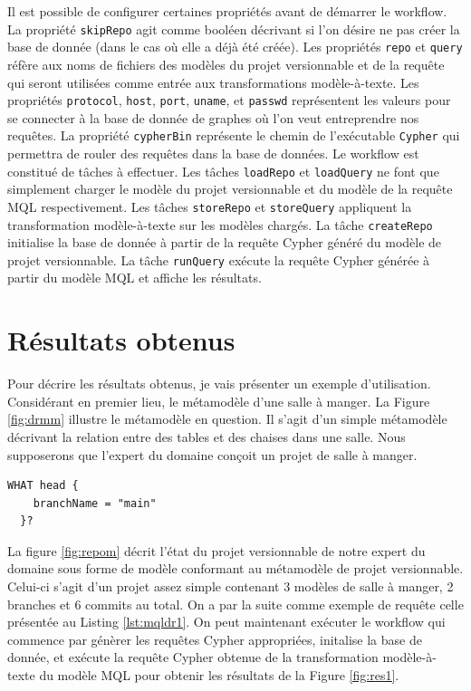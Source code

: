\documentclass[12pt, titlepage]{article}
\begin{document}
Il est possible de configurer certaines propriétés avant de démarrer le
workflow. La propriété \texttt{skipRepo} agit comme booléen décrivant si l'on
désire ne pas créer la base de donnée (dans le cas où elle a déjà été créée).
Les propriétés \texttt{repo} et \texttt{query} réfère aux noms de fichiers des
modèles du projet versionnable et de la requête qui seront utilisées comme
entrée aux transformations modèle-à-texte. Les propriétés \texttt{protocol},
\texttt{host}, \texttt{port}, \texttt{uname}, et \texttt{passwd} représentent
les valeurs pour se connecter à la base de donnée de graphes où l'on veut
entreprendre nos requêtes. La propriété \texttt{cypherBin} représente le chemin
de l'exécutable \texttt{Cypher} qui permettra de rouler des requêtes dans la
base de données. Le workflow est constitué de tâches à effectuer. Les tâches
\texttt{loadRepo} et \texttt{loadQuery} ne font que simplement charger le modèle
du projet versionnable et du modèle de la requête MQL respectivement. Les tâches
\texttt{storeRepo} et \texttt{storeQuery} appliquent la transformation
modèle-à-texte sur les modèles chargés. La tâche \texttt{createRepo} initialise
la base de donnée à partir de la requête Cypher généré du modèle de projet
versionnable. La tâche \texttt{runQuery} exécute la requête Cypher générée à
partir du modèle MQL et affiche les résultats.

\section*{Résultats obtenus}

Pour décrire les résultats obtenus, je vais présenter un exemple d'utilisation.
Considérant en premier lieu, le métamodèle d'une salle à manger. La Figure
\ref{fig:drmm} illustre le métamodèle en question. Il s'agit d'un simple
métamodèle décrivant la relation entre des tables et des chaises dans une
salle. Nous supposerons que l'expert du domaine conçoit un projet de salle à
manger. 

\begin{lstlisting}[style=mql,label=lst:mqldr1, caption=Exemple d'expression MQL]
  WHAT head {
    branchName = "main"
  }?
\end{lstlisting}

La figure \ref{fig:repom} décrit l'état du projet versionnable de notre expert
du domaine sous forme de modèle conformant au métamodèle de projet
versionnable. Celui-ci s'agit d'un projet assez simple contenant 3 modèles de
salle à manger, 2 branches et 6 commits au total. On a par la suite comme
exemple de requête celle présentée au Listing \ref{lst:mqldr1}. On peut
maintenant exécuter le workflow qui commence par génèrer les requêtes Cypher
appropriées, initalise la base de donnée, et exécute la requête Cypher obtenue
de la transformation modèle-à-texte du modèle MQL pour obtenir les résultats de
la Figure \ref{fig:res1}.
\end{document}
